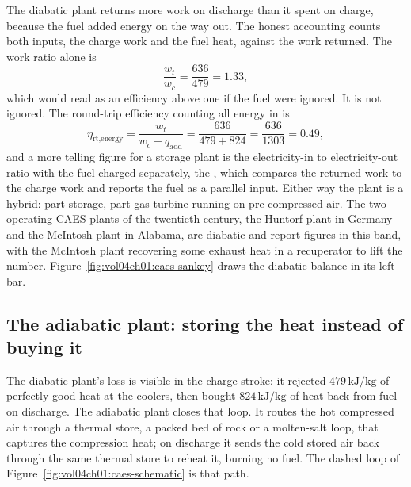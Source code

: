 The diabatic plant returns more work on discharge than it spent on
charge, because the fuel added energy on the way out. The honest
accounting counts both inputs, the charge work and the fuel heat, against
the work returned. The work ratio alone is
\[
\frac{w_t}{w_c} = \frac{636}{479} = 1.33,
\]
which would read as an efficiency above one if the fuel were ignored. It
is not ignored. The round-trip efficiency counting all energy in is
\[
\eta_{\text{rt,energy}} = \frac{w_t}{w_c + q_{\text{add}}}
  = \frac{636}{479 + 824} = \frac{636}{1303} = 0.49,
\]
and a more telling figure for a storage plant is the electricity-in to
electricity-out ratio with the fuel charged separately, the
, which compares the returned
work to the charge work and reports the fuel as a parallel input. Either
way the plant is a hybrid: part storage, part gas turbine running on
pre-compressed air. The two operating CAES plants of the twentieth
century, the Huntorf plant in Germany and the McIntosh plant in Alabama,
are diabatic and report figures in this band, with the McIntosh plant
recovering some exhaust heat in a recuperator to lift the number.
Figure~\ref{fig:vol04ch01:caes-sankey} draws the diabatic balance in its
left bar.

\subsection{The adiabatic plant: storing the heat instead of buying it}

The diabatic plant's loss is visible in the charge stroke: it rejected
$479\,\text{kJ}/\text{kg}$ of perfectly good heat at the coolers, then
bought $824\,\text{kJ}/\text{kg}$ of heat back from fuel on discharge.
The adiabatic plant closes that loop. It routes the hot compressed air
through a thermal store, a packed bed of rock or a molten-salt loop, that
captures the compression heat; on discharge it sends the cold stored air
back through the same thermal store to reheat it, burning no fuel. The
dashed loop of Figure~\ref{fig:vol04ch01:caes-schematic} is that path.

